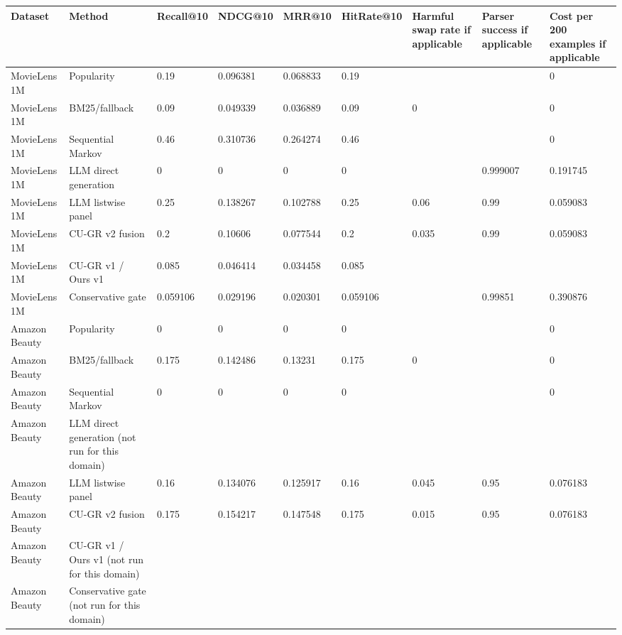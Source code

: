 \begin{tabular}{lllllllll}
\toprule
Dataset & Method & Recall@10 & NDCG@10 & MRR@10 & HitRate@10 & Harmful swap rate if applicable & Parser success if applicable & Cost per 200 examples if applicable \\
\midrule
MovieLens 1M & Popularity & 0.19 & 0.096381 & 0.068833 & 0.19 &  &  & 0 \\
MovieLens 1M & BM25/fallback & 0.09 & 0.049339 & 0.036889 & 0.09 & 0 &  & 0 \\
MovieLens 1M & Sequential Markov & 0.46 & 0.310736 & 0.264274 & 0.46 &  &  & 0 \\
MovieLens 1M & LLM direct generation & 0 & 0 & 0 & 0 &  & 0.999007 & 0.191745 \\
MovieLens 1M & LLM listwise panel & 0.25 & 0.138267 & 0.102788 & 0.25 & 0.06 & 0.99 & 0.059083 \\
MovieLens 1M & CU-GR v2 fusion & 0.2 & 0.10606 & 0.077544 & 0.2 & 0.035 & 0.99 & 0.059083 \\
MovieLens 1M & CU-GR v1 / Ours v1 & 0.085 & 0.046414 & 0.034458 & 0.085 &  &  &  \\
MovieLens 1M & Conservative gate & 0.059106 & 0.029196 & 0.020301 & 0.059106 &  & 0.99851 & 0.390876 \\
Amazon Beauty & Popularity & 0 & 0 & 0 & 0 &  &  & 0 \\
Amazon Beauty & BM25/fallback & 0.175 & 0.142486 & 0.13231 & 0.175 & 0 &  & 0 \\
Amazon Beauty & Sequential Markov & 0 & 0 & 0 & 0 &  &  & 0 \\
Amazon Beauty & LLM direct generation (not run for this domain) &  &  &  &  &  &  &  \\
Amazon Beauty & LLM listwise panel & 0.16 & 0.134076 & 0.125917 & 0.16 & 0.045 & 0.95 & 0.076183 \\
Amazon Beauty & CU-GR v2 fusion & 0.175 & 0.154217 & 0.147548 & 0.175 & 0.015 & 0.95 & 0.076183 \\
Amazon Beauty & CU-GR v1 / Ours v1 (not run for this domain) &  &  &  &  &  &  &  \\
Amazon Beauty & Conservative gate (not run for this domain) &  &  &  &  &  &  &  \\
\bottomrule
\end{tabular}
